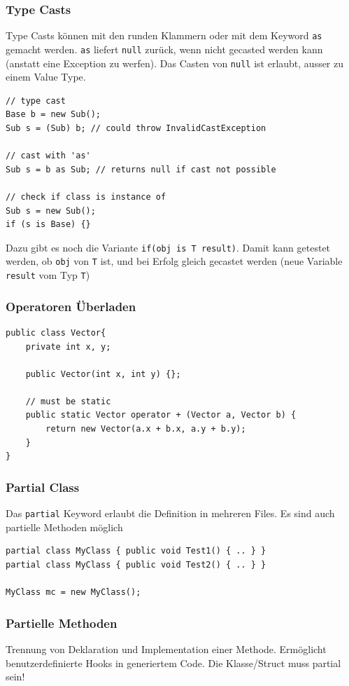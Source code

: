 \documentclass[
a4paper,
oneside,
10pt,
fleqn,
headsepline,
toc=listofnumbered, 
bibliography=totocnumbered]{scrartcl}
\begin{document}
\subsubsection{Type Casts}
Type Casts können mit den runden Klammern oder mit dem Keyword \lstinline|as| gemacht werden. \lstinline|as| liefert \lstinline|null| zurück, wenn nicht gecasted werden kann (anstatt eine Exception zu werfen). Das Casten von \lstinline|null| ist erlaubt, ausser zu einem Value Type.
\begin{lstlisting}
// type cast
Base b = new Sub();
Sub s = (Sub) b; // could throw InvalidCastException

// cast with 'as'
Sub s = b as Sub; // returns null if cast not possible

// check if class is instance of
Sub s = new Sub();
if (s is Base) {}
\end{lstlisting}

Dazu gibt es noch die Variante \lstinline|if(obj is T result)|. Damit kann getestet werden, ob \lstinline|obj| von \lstinline|T| ist, und bei Erfolg gleich gecastet werden (neue Variable \lstinline|result| vom Typ \lstinline|T|)


\subsubsection{Operatoren Überladen}
\begin{lstlisting}
public class Vector{
	private int x, y;
	
	public Vector(int x, int y) {};
	
	// must be static
	public static Vector operator + (Vector a, Vector b) {
		return new Vector(a.x + b.x, a.y + b.y);
	}						
}
\end{lstlisting}

\subsubsection{Partial Class}
Das \lstinline|partial| Keyword erlaubt die Definition in mehreren Files. Es sind auch partielle Methoden möglich
\begin{lstlisting}
partial class MyClass { public void Test1() { .. } }
partial class MyClass { public void Test2() { .. } }

MyClass mc = new MyClass();
\end{lstlisting}

\subsubsection{Partielle Methoden}
Trennung von Deklaration und Implementation einer Methode. Ermöglicht benutzerdefinierte Hooks in generiertem Code. Die Klasse/Struct muss partial sein!
\end{document}
